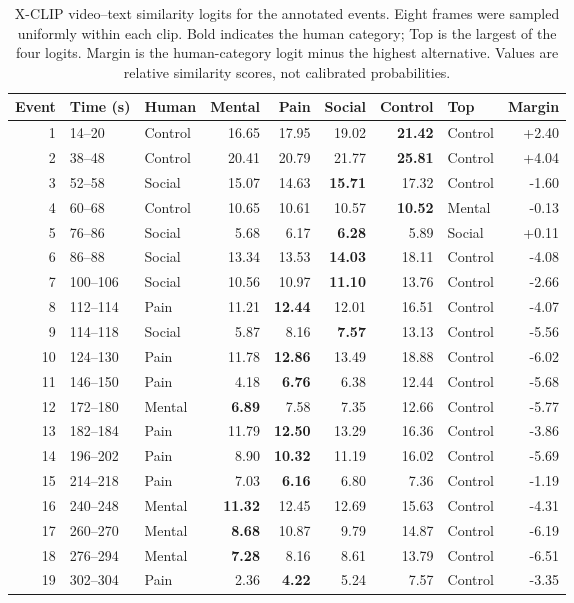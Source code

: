 \begin{table}[htbp]
\centering\scriptsize
\setlength{\tabcolsep}{4pt}
\begin{tabular}{rllrrrrlr}
\toprule
Event & Time (s) & Human & Mental & Pain & Social & Control & Top & Margin \\
\midrule
1 & 14--20 & Control & 16.65 & 17.95 & 19.02 & \textbf{21.42} & Control & +2.40 \\
2 & 38--48 & Control & 20.41 & 20.79 & 21.77 & \textbf{25.81} & Control & +4.04 \\
3 & 52--58 & Social & 15.07 & 14.63 & \textbf{15.71} & 17.32 & Control & -1.60 \\
4 & 60--68 & Control & 10.65 & 10.61 & 10.57 & \textbf{10.52} & Mental & -0.13 \\
5 & 76--86 & Social & 5.68 & 6.17 & \textbf{6.28} & 5.89 & Social & +0.11 \\
6 & 86--88 & Social & 13.34 & 13.53 & \textbf{14.03} & 18.11 & Control & -4.08 \\
7 & 100--106 & Social & 10.56 & 10.97 & \textbf{11.10} & 13.76 & Control & -2.66 \\
8 & 112--114 & Pain & 11.21 & \textbf{12.44} & 12.01 & 16.51 & Control & -4.07 \\
9 & 114--118 & Social & 5.87 & 8.16 & \textbf{7.57} & 13.13 & Control & -5.56 \\
10 & 124--130 & Pain & 11.78 & \textbf{12.86} & 13.49 & 18.88 & Control & -6.02 \\
11 & 146--150 & Pain & 4.18 & \textbf{6.76} & 6.38 & 12.44 & Control & -5.68 \\
12 & 172--180 & Mental & \textbf{6.89} & 7.58 & 7.35 & 12.66 & Control & -5.77 \\
13 & 182--184 & Pain & 11.79 & \textbf{12.50} & 13.29 & 16.36 & Control & -3.86 \\
14 & 196--202 & Pain & 8.90 & \textbf{10.32} & 11.19 & 16.02 & Control & -5.69 \\
15 & 214--218 & Pain & 7.03 & \textbf{6.16} & 6.80 & 7.36 & Control & -1.19 \\
16 & 240--248 & Mental & \textbf{11.32} & 12.45 & 12.69 & 15.63 & Control & -4.31 \\
17 & 260--270 & Mental & \textbf{8.68} & 10.87 & 9.79 & 14.87 & Control & -6.19 \\
18 & 276--294 & Mental & \textbf{7.28} & 8.16 & 8.61 & 13.79 & Control & -6.51 \\
19 & 302--304 & Pain & 2.36 & \textbf{4.22} & 5.24 & 7.57 & Control & -3.35 \\
\bottomrule
\end{tabular}
\caption{X-CLIP video--text similarity logits for the annotated events. Eight frames were sampled uniformly within each clip. Bold indicates the human category; Top is the largest of the four logits. Margin is the human-category logit minus the highest alternative. Values are relative similarity scores, not calibrated probabilities.}
\label{tab:xclip-partly-cloudy}
\end{table}
